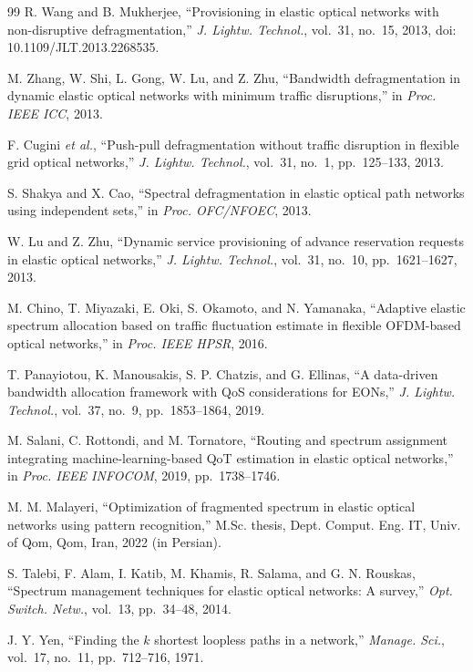 \documentclass[preprint,12pt]{elsarticle}
\begin{document}
\begin{thebibliography}{99}
R. Wang and B. Mukherjee, ``Provisioning in elastic optical networks with non-disruptive defragmentation,'' \textit{J. Lightw. Technol.}, vol.~31, no.~15, 2013, doi: 10.1109/JLT.2013.2268535.

M. Zhang, W. Shi, L. Gong, W. Lu, and Z. Zhu, ``Bandwidth defragmentation in dynamic elastic optical networks with minimum traffic disruptions,'' in \textit{Proc. IEEE ICC}, 2013.

F. Cugini \textit{et al.}, ``Push-pull defragmentation without traffic disruption in flexible grid optical networks,'' \textit{J. Lightw. Technol.}, vol.~31, no.~1, pp.~125--133, 2013.

S. Shakya and X. Cao, ``Spectral defragmentation in elastic optical path networks using independent sets,'' in \textit{Proc. OFC/NFOEC}, 2013.

W. Lu and Z. Zhu, ``Dynamic service provisioning of advance reservation requests in elastic optical networks,'' \textit{J. Lightw. Technol.}, vol.~31, no.~10, pp.~1621--1627, 2013.

M. Chino, T. Miyazaki, E. Oki, S. Okamoto, and N. Yamanaka, ``Adaptive elastic spectrum allocation based on traffic fluctuation estimate in flexible OFDM-based optical networks,'' in \textit{Proc. IEEE HPSR}, 2016.

T. Panayiotou, K. Manousakis, S. P. Chatzis, and G. Ellinas, ``A data-driven bandwidth allocation framework with QoS considerations for EONs,'' \textit{J. Lightw. Technol.}, vol.~37, no.~9, pp.~1853--1864, 2019.

M. Salani, C. Rottondi, and M. Tornatore, ``Routing and spectrum assignment integrating machine-learning-based QoT estimation in elastic optical networks,'' in \textit{Proc. IEEE INFOCOM}, 2019, pp.~1738--1746.

M. M. Malayeri, ``Optimization of fragmented spectrum in elastic optical networks using pattern recognition,'' M.Sc. thesis, Dept. Comput. Eng. IT, Univ. of Qom, Qom, Iran, 2022 (in Persian).

S. Talebi, F. Alam, I. Katib, M. Khamis, R. Salama, and G. N. Rouskas, ``Spectrum management techniques for elastic optical networks: A survey,'' \textit{Opt. Switch. Netw.}, vol.~13, pp.~34--48, 2014.

J. Y. Yen, ``Finding the $k$ shortest loopless paths in a network,'' \textit{Manage. Sci.}, vol.~17, no.~11, pp.~712--716, 1971.


\end{thebibliography}
\end{document}

